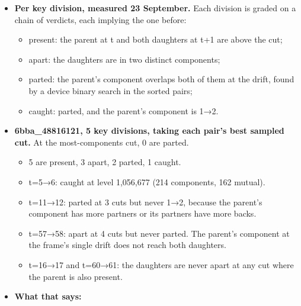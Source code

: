\begin{itemize}
\begin{itemize}
\begin{itemize}
\item 6bba\_\allowbreak{}48816121: 6,688 moves, 570 1→2, 590 2→1, 42,853 disappear, 40,996 appear, out of 61,679 components. The key holds 5 divisions over these pairs.
\item 44b6\_\allowbreak{}0113de3b: 7,962 moves, 819 1→2, 789 2→1, 22,545 disappear, 21,517 appear, out of 39,507. The key holds 0 divisions.
\item So at the most-components cut, about 70\% of the components have no partner at the drift: specks that do not persist. Higher in the tree about 20\% do.
\item The key annotates about 9 cells a frame. Census totals cannot be graded against it. Only a per-division verdict can.
\end{itemize}
\item \textbf{Per key division, measured 23 September.} Each division is graded on a chain of verdicts, each implying the one before:

\begin{itemize}
\item present: the parent at t and both daughters at t+1 are above the cut;
\item apart: the daughters are in two distinct components;
\item parted: the parent's component overlaps both of them at the drift, found by a device binary search in the sorted pairs;
\item caught: parted, and the parent's component is 1→2.
\end{itemize}
\item \textbf{6bba\_\allowbreak{}48816121, 5 key divisions, taking each pair's best sampled cut.} At the most-components cut, 0 are parted.

\begin{itemize}
\item 5 are present, 3 apart, 2 parted, 1 caught.
\item t=5→6: caught at level 1,056,677 (214 components, 162 mutual).
\item t=11→12: parted at 3 cuts but never 1→2, because the parent's component has more partners or its partners have more backs.
\item t=57→58: apart at 4 cuts but never parted. The parent's component at the frame's single drift does not reach both daughters.
\item t=16→17 and t=60→61: the daughters are never apart at any cut where the parent is also present.
\end{itemize}
\item \textbf{What that says:}


\end{itemize}
\end{itemize}
